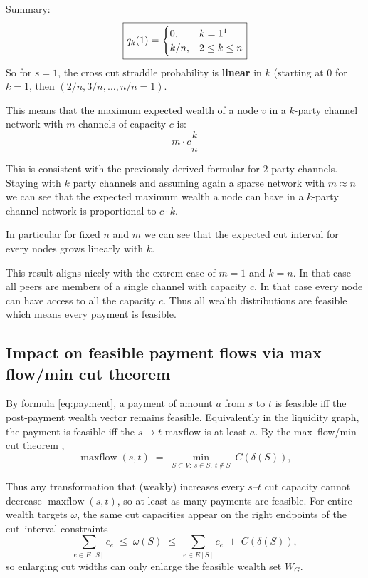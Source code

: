 \documentclass[10pt,twocolumn]{article}
\begin{document}
Summary:
\[
\boxed{q_k(1)=\begin{cases}
0,&k=1 \footnotemark
\\
k/n,&2\le k\le n
\end{cases}}
\]
So for $s=1$, the cross cut straddle probability is \textbf{linear} in $k$ (starting at $0$ for $k=1$, then $(2/n,3/n,\dots,n/n = 1)$.

This means that the maximum expected wealth of a node $v$ in a $k$-party channel network with $m$ channels of capacity $c$ is:
\[
m\cdot c \frac{k}{n}
\]

This is consistent with the previously derived formular for $2$-party channels. Staying with $k$ party channels and assuming again a sparse network with $m\approx n$ we can see that the expected maximum wealth a node can have in a $k$-party channel network is proportional to $c\cdot k$.

In particular for fixed $n$ and $m$ we can see that the expected cut interval for every nodes grows linearly with $k$.

This result aligns nicely with the extrem case of $m=1$ and $k=n$. In that case all peers are members of a single channel with capacity $c$. In that case every node can have access to all the capacity $c$. Thus all wealth distributions are feasible which means every payment is feasible. 



\subsection{Impact on feasible payment flows via max flow/min cut theorem}


By formula \eqref{eq:payment}, a payment of amount $a$ from $s$ to $t$ is feasible iff the post-payment
wealth vector remains feasible. Equivalently in the liquidity graph, the payment is feasible iff the $s\!\to t$ maxflow is at least $a$.
By the max–flow/min–cut theorem \cite{elias1956note,FordFulkerson1956},
\[
\operatorname{maxflow}(s,t)\;=\;\min_{S\subset V:\ s\in S,\ t\notin S}\ C(\delta(S)),
\]


Thus any transformation that (weakly) increases every $s$–$t$ cut capacity cannot decrease
$\operatorname{maxflow}(s,t)$, so at least as many payments are feasible.
For entire wealth targets $\omega$, the same cut capacities appear on the right endpoints of the
cut–interval constraints
\[
\sum_{e\in E[S]} c_e \;\le\; \omega(S) \;\le\; \sum_{e\in E[S]} c_e \;+\; C(\delta(S)),
\]
so enlarging cut widths can only enlarge the feasible wealth set $W_G$.
\end{document}
